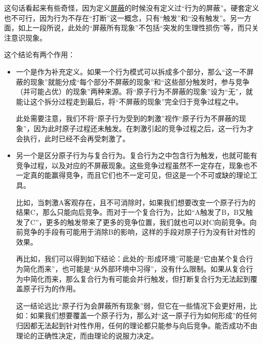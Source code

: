 \noindent{}
\begin{explain}
这句话看起来有些奇怪，因为定义\hyperref[def:屏蔽]{屏蔽}的时候没有定义过“行为的屏蔽”。硬套定义也不可行，因为行为不存在“打断”这一概念，只有“触发”和“没有触发”。另一方面，如上一段所说，此处的“屏蔽所有现象”不包括“突发的生理性损伤”等，而只关注意识现象。

这个结论有两个作用：
\begin{itemize}
\item 一个是作为补充定义。如果一个行为模式可以拆成多个部分，那么“这一不屏蔽的现象”就能分成“每个部分不屏蔽的现象”和“这些部分触发时，参与竞争（并可能占优）的现象”两种来源。将“原子行为不屏蔽的现象”设为“无”，就能让这个拆分过程走到最后，将“不屏蔽的现象”完全归于竞争过程之中。

此处需要注意，我们不将“原子行为受到的刺激”视作“原子行为不屏蔽的现象”，因为此时原子过程还未触发。在刺激引起的竞争过程之后，这一行为才会执行，此时已经不会再受刺激了。

\item 另一个是区分原子行为与复合行为。复合行为之中包含行为触发，也就可能有竞争过程，以及对应的不屏蔽现象。这些竞争过程虽然不一定存在，现象也不一定真的能赢得竞争，而且它们也不一定可见，但这是一个不可或缺的理论工具。

比如，当刺激A客观存在，且不可消除时，如果我们想要改变一个原子行为的结果C，那么只能向后竞争。而对于一个复合行为，比如“A触发了B，B又触发了C”，更多的触发带来了更多的竞争位置，我们就也可以对C向前竞争。向前竞争的手段有可能用于消除B的影响，这样的手段对原子行为没有针对性的效果。

再比如，我们可以得到如下结论：此处的“形成环境”可能是“它由某个复合行为简化而来”，也可能是“从外部环境中习得”，没有什么限制。如果从复合行为中简化而来，那么复合行为有可能会并行触发，但打断复合行为无法起到覆盖原子行为的作用。

这一结论远比“原子行为会屏蔽所有现象”弱，但它在一些情况下会更好用，比如：如果我们想要覆盖一个原子行为，那么对“这一原子行为如何形成”的任何归因都无法起到针对性作用，任何的理论都只能参与向后竞争。能否成功不由理论的正确性决定，而由理论的说服力决定。
\end{itemize}
\insertparanotes
\end{explain}
